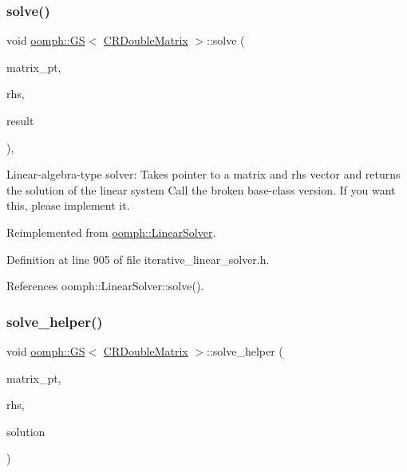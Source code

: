 \subsubsection{\texorpdfstring{solve()}{solve()}\hspace{0.1cm}{\footnotesize\ttfamily [3/3]}}
{\footnotesize\ttfamily void \hyperlink{classoomph_1_1GS}{oomph\+::\+GS}$<$ \hyperlink{classoomph_1_1CRDoubleMatrix}{C\+R\+Double\+Matrix} $>$\+::solve (\begin{DoxyParamCaption}\item[{\hyperlink{classoomph_1_1DoubleMatrixBase}{Double\+Matrix\+Base} $\ast$const \&}]{matrix\+\_\+pt,  }\item[{const \hyperlink{classoomph_1_1Vector}{Vector}$<$ double $>$ \&}]{rhs,  }\item[{\hyperlink{classoomph_1_1Vector}{Vector}$<$ double $>$ \&}]{result }\end{DoxyParamCaption})\hspace{0.3cm}{\ttfamily [inline]}, {\ttfamily [virtual]}}



Linear-\/algebra-\/type solver\+: Takes pointer to a matrix and rhs vector and returns the solution of the linear system Call the broken base-\/class version. If you want this, please implement it. 



Reimplemented from \hyperlink{classoomph_1_1LinearSolver_a1f7a2ee2cd18d3dafc20a61ca2f52dbb}{oomph\+::\+Linear\+Solver}.



Definition at line 905 of file iterative\+\_\+linear\+\_\+solver.\+h.



References oomph\+::\+Linear\+Solver\+::solve().

\mbox{\label{classoomph_1_1GS_3_01CRDoubleMatrix_01_4_a12a720316ec6fde47e0fa524bd8728b1}} 
\subsubsection{\texorpdfstring{solve\+\_\+helper()}{solve\_helper()}}
{\footnotesize\ttfamily void \hyperlink{classoomph_1_1GS}{oomph\+::\+GS}$<$ \hyperlink{classoomph_1_1CRDoubleMatrix}{C\+R\+Double\+Matrix} $>$\+::solve\+\_\+helper (\begin{DoxyParamCaption}\item[{\hyperlink{classoomph_1_1DoubleMatrixBase}{Double\+Matrix\+Base} $\ast$const \&}]{matrix\+\_\+pt,  }\item[{const \hyperlink{classoomph_1_1DoubleVector}{Double\+Vector} \&}]{rhs,  }\item[{\hyperlink{classoomph_1_1DoubleVector}{Double\+Vector} \&}]{solution }\end{DoxyParamCaption})\hspace{0.3cm}{\ttfamily [private]}}



